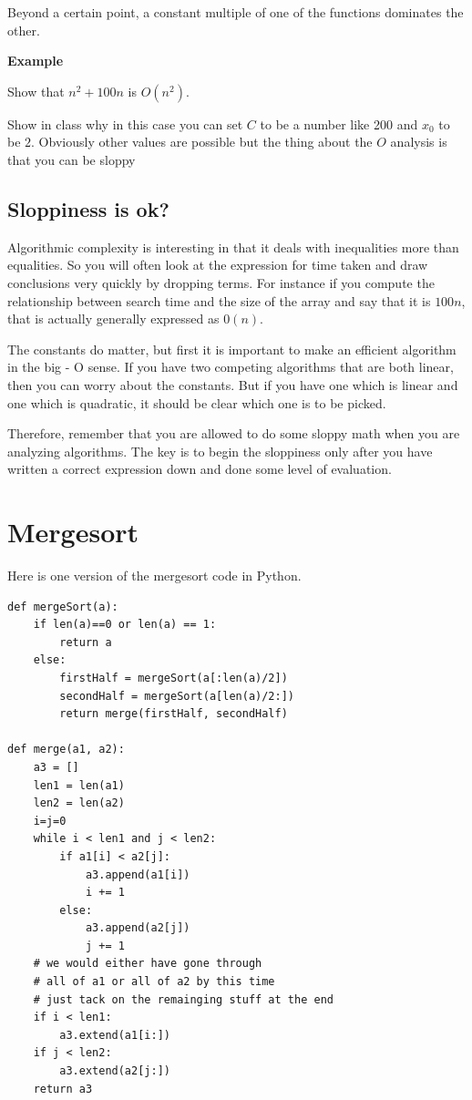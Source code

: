 \documentclass[12pt]{article}
\begin{document}
Beyond a certain point, a constant multiple of one of the functions dominates the other.

\medskip

\textbf{Example}

Show that $n^2 + 100n$ is $O(n^2)$.

\medskip

Show in class why in this case you can set $C$ to be a number like 200 and $x_0$ to be $2$. Obviously other values are possible but the thing about the $O$ analysis is that you can be sloppy


\subsection*{Sloppiness is ok?}

Algorithmic complexity is interesting in that it deals with inequalities more than equalities. So you will often look at the expression for time taken and draw conclusions very quickly by dropping terms. For instance if you compute the relationship between search time and the size of the array and say that it is $100n$, that is actually generally expressed as $0(n)$. 

The constants do matter, but first it is important to make an efficient algorithm in the big - O sense. If you have two competing algorithms that are both linear, then you can worry about the constants. But if you have one which is linear and one which is quadratic, it should be clear which one is to be picked.

Therefore, remember that you are allowed to do some sloppy math when you are analyzing algorithms. The key is to begin the sloppiness only after you have written a correct expression down and done some level of evaluation.


\section*{Mergesort}

Here is one version of the mergesort code in Python. 

\begin{verbatim}
def mergeSort(a):
    if len(a)==0 or len(a) == 1:
        return a
    else:
        firstHalf = mergeSort(a[:len(a)/2])
        secondHalf = mergeSort(a[len(a)/2:])
        return merge(firstHalf, secondHalf)

def merge(a1, a2):
    a3 = []
    len1 = len(a1)
    len2 = len(a2)
    i=j=0
    while i < len1 and j < len2:
        if a1[i] < a2[j]:
            a3.append(a1[i])
            i += 1
        else:
            a3.append(a2[j])
            j += 1
    # we would either have gone through
    # all of a1 or all of a2 by this time
    # just tack on the remainging stuff at the end
    if i < len1:
        a3.extend(a1[i:])
    if j < len2:
        a3.extend(a2[j:])
    return a3
\end{verbatim}
\end{document}
